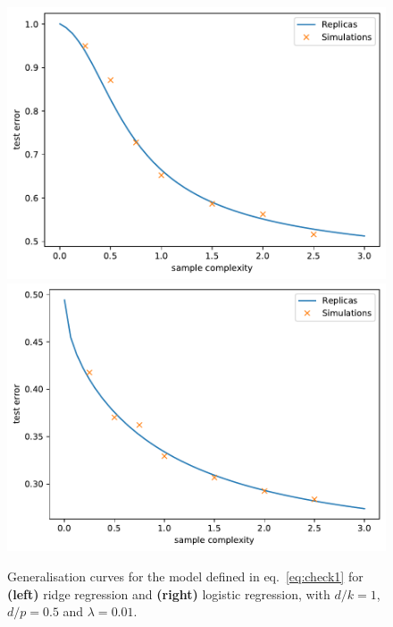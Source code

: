 \documentclass[11pt]{article}
\numberwithin{equation}{section}
\begin{document}
 \begin{figure}[h]
		\centering
		\includegraphics[scale=0.45]{../code/figs/check_ridge}
		\includegraphics[scale=0.45]{../code/figs/check_logistic}
	\caption{Generalisation curves for the model defined in eq.~\eqref{eq:check1} for \textbf{(\textbf{left})} ridge regression and \textbf{(\textbf{right})} logistic regression, with $d/k = 1$, $d/p = 0.5$ and $\lambda = 0.01$.
	}
	\label{fig:check1}
\end{figure}
\end{document}
